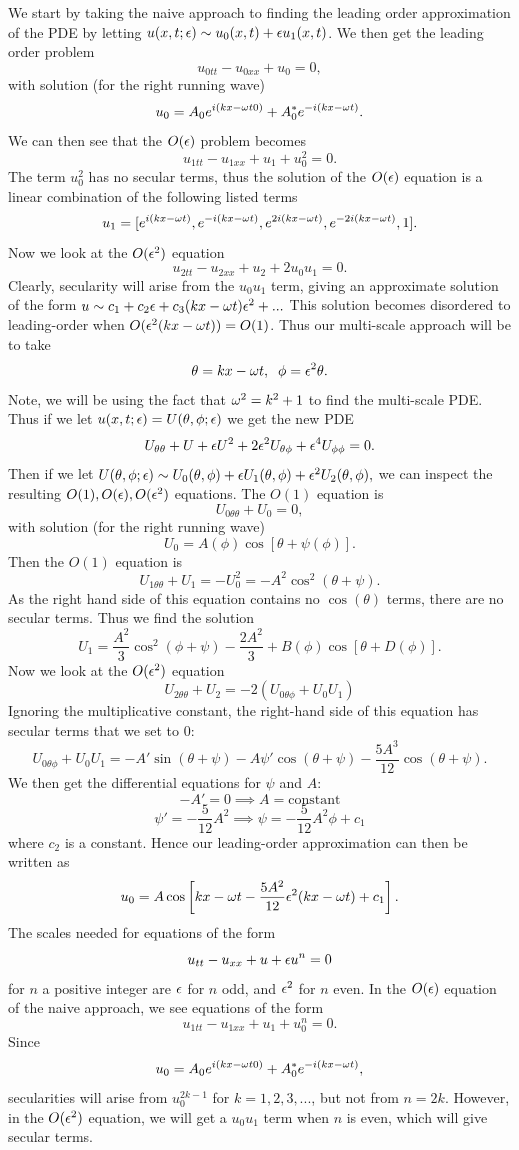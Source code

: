 We start by taking the naive approach to finding the leading order approximation of the PDE by letting $u(x,t;\epsilon)\sim u_0(x,t)+\epsilon u_1(x,t)$. We then get the leading order problem
$$u_{0tt}-u_{0xx}+u_0=0,$$
with solution (for the right running wave)
$$u_0=A_0 e^{i(kx-\omega t0)}+A_0^* e^{-i(kx-\omega t)}.$$
We can then see that the $O(\epsilon)$ problem becomes
$$u_{1tt}-u_{1xx}+u_1+u_0^2=0.$$
The term $u_0^2$ has no secular terms, thus the solution of the $O(\epsilon)$ equation is a linear combination of the following listed terms
$$u_1=[e^{i(kx-\omega t)},e^{-i(kx-\omega t)},e^{2i(kx-\omega t)},e^{-2i(kx-\omega t)},1].$$
Now we look at the $O(\epsilon^2)$ equation
$$u_{2tt}-u_{2xx}+u_2+2u_0u_1=0.$$
Clearly, secularity will arise from the $u_0u_1$ term, giving an approximate solution of the form
$u\sim c_1+c_2\epsilon+c_3(kx-\omega t)\epsilon^2+...$
This solution becomes disordered to leading-order when $O(\epsilon^2(kx-\omega t))=O(1)$. Thus our multi-scale approach will be to take
$$\theta=kx-\omega t,\;\;\phi=\epsilon^2\theta.$$
Note, we will be using the fact that $\omega^2=k^2+1$ to find the multi-scale PDE. Thus if we let $u(x,t;\epsilon)=U(\theta,\phi;\epsilon)$ we get the new PDE
$$U_{\theta\theta}+U+\epsilon U^2+2\epsilon^2U_{\theta\phi}+\epsilon^4 U_{\phi\phi}=0.$$
Then if we let $U(\theta,\phi;\epsilon)\sim U_0(\theta,\phi)+\epsilon U_1(\theta,\phi)+\epsilon^2U_2(\theta,\phi),$ we can inspect the resulting $O(1),O(\epsilon),O(\epsilon^2)$ equations. The $O(1)$ equation is
$$U_{0\theta\theta}+U_0=0,$$
with solution (for the right running wave)
$$U_0=A(\phi)\cos[\theta+\psi(\phi)].$$
Then the $O(1)$ equation is
$$U_{1\theta\theta}+U_1=-U_0^2=-A^2\cos^2(\theta+\psi).$$
As the right hand side of this equation contains no $\cos(\theta)$ terms, there are no secular terms. Thus we find the solution
$$U_1=\frac{A^2}{3}\cos^2(\phi+\psi)-\frac{2A^2}{3}+B(\phi)\cos[\theta+D(\phi)].$$
Now we look at the $O(\epsilon^2)$ equation
$$U_{2\theta\theta}+U_2=-2(U_{0\theta\phi}+U_0U_1)$$
Ignoring the multiplicative constant, the right-hand side of this equation has secular terms that we set to 0:
$$U_{0\theta\phi}+U_0U_1=-A'\sin(\theta+\psi)-A\psi'\cos(\theta+\psi)-\frac{5A^3}{12}\cos(\theta+\psi).$$
We then get the differential equations for $\psi$ and $A$:
$$-A'=0\implies A=\text{constant}$$
$$\psi'=-\frac{5}{12}A^2\implies \psi=-\frac{5}{12}A^2\phi+c_1$$
where $c_2$ is a constant. Hence our leading-order approximation can then be written as
$$u_0=A\cos\left[kx-\omega t-\frac{5A^2}{12}\epsilon^2(kx-\omega t)+c_1\right].$$
The scales needed for equations of the form
$$u_{tt}-u_{xx}+u+\epsilon u^n=0$$
for $n$ a positive integer are $\epsilon$ for $n$ odd, and $\epsilon^2$ for $n$ even. In the $O(\epsilon)$ equation of the naive approach, we see equations of the form
$$u_{1tt}-u_{1xx}+u_1+u_0^n=0.$$
Since
$$u_0=A_0 e^{i(kx-\omega t0)}+A_0^* e^{-i(kx-\omega t)},$$
secularities will arise from $u_0^{2k-1}$ for $k=1,2,3,...$, but not from $n=2k$. However, in the $O(\epsilon^2)$ equation, we will get a $u_0u_1$ term when $n$ is even, which will give secular terms.

